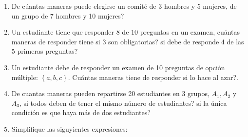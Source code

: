 \begin{Ejer}
\begin{enumerate}
\item De c\'uantas maneras puede elegirse un comit\'e de 3 hombres y 5 mujeres, de un grupo de 7 hombres y 10 mujeres?

\item Un estudiante tiene que responder 8 de 10 preguntas en un examen, cu\'antas maneras de responder tiene si 3 son obligatorias? si debe de responde 4 de las 5 primeras preguntas?


\item Un estudiante debe de responder un examen de 10 preguntas de opci\'on m\'ultiple: $\left\{a,b,c\right\}$. Cu\'antas maneras tiene de responder si lo hace al azar?. 


\item De cuantas maneras pueden repartirse 20 estudiantes en 3 grupos, $A_{1},A_{2}$ y $A_{3}$,   si todos deben de tener el mismo n\'umero de estudiantes? si la \'unica condici\'on es que haya m\'as de dos estudiantes?

\item Simplifique las siguyientes expresiones:

\begin{itemize}
\end{itemize}

\end{enumerate}

\end{Ejer}


